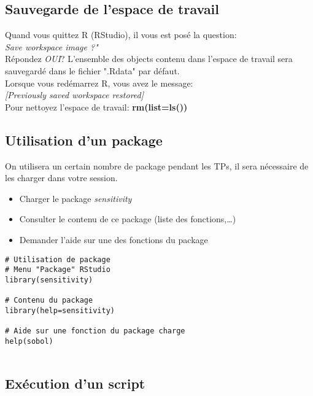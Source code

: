 \documentclass[12pt,twoside,openright]{article}
\begin{document}
\subsection{Sauvegarde de l'espace de travail}

Quand vous quittez R (RStudio), il vous est posé la question:\\

 \emph{Save workspace image ?"} \\
 
Répondez \emph{OUI}? L'ensemble des objects contenu dans l'espace de travail sera sauvegardé dans le fichier ".Rdata" par défaut. \\

Lorsque vous redémarrez R, vous avez le message:\\

 \emph{[Previously saved workspace restored]}\\

Pour nettoyez l'espace de travail: {\bf rm(list=ls())}

\subsection{Utilisation d'un package}

On utilisera un certain nombre de package pendant les TPs, il sera nécessaire de les charger dans votre session.\\

\begin{itemize}
\item Charger le package \emph{sensitivity}
\item Consulter le contenu de ce package (liste des fonctions,…)
\item Demander l'aide sur une des fonctions du package
\end{itemize}

\begin{verbatim}
# Utilisation de package
# Menu "Package" RStudio
library(sensitivity)

# Contenu du package
library(help=sensitivity)

# Aide sur une fonction du package charge
help(sobol)


\end{verbatim}

\subsection{ Exécution d'un script}
\end{document}
